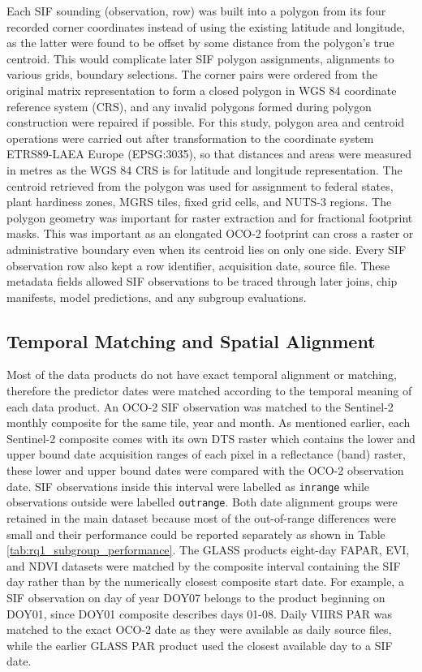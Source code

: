 Each SIF sounding (observation, row) was built into a polygon from its four recorded corner coordinates instead of using the existing latitude and longitude, as the latter were found to be offset by some distance from the polygon's true centroid. This would complicate later SIF polygon assignments, alignments to various grids, boundary selections. The corner pairs were ordered from the original matrix representation to form a closed polygon in WGS 84 coordinate reference system (CRS), and any invalid polygons formed during polygon construction were repaired if possible. For this study, polygon area and centroid operations were carried out after transformation to the coordinate system ETRS89-LAEA Europe (EPSG:3035), so that distances and areas were measured in metres as the WGS 84 CRS is for latitude and longitude representation. The centroid retrieved from the polygon was used for assignment to federal states, plant hardiness zones, MGRS tiles, fixed grid cells, and NUTS-3 regions. The polygon geometry was important for raster extraction and for fractional footprint masks. This was important as  an elongated OCO-2 footprint can cross a raster or administrative boundary even when its centroid lies on only one side. Every SIF observation row also kept a row identifier, acquisition date, source file. These metadata fields allowed SIF observations to be traced through later joins, chip manifests, model predictions, and any subgroup evaluations.

\subsection{Temporal Matching and Spatial Alignment}

Most of the data products do not have exact temporal alignment or matching, therefore the predictor dates were matched according to the temporal meaning of each data product. An OCO-2 SIF observation was matched to the Sentinel-2 monthly composite for the same tile, year and month. As mentioned earlier, each Sentinel-2 composite comes with its own DTS raster which contains the lower and upper bound date acquisition ranges of each pixel in a reflectance (band) raster, these lower and upper bound dates were compared with the OCO-2 observation date. SIF observations inside this interval were labelled as \texttt{inrange} while observations outside were labelled \texttt{outrange}. Both date alignment groups were retained in the main dataset because most of the out-of-range differences were small and their performance could be reported separately as shown in Table \ref{tab:rq1_subgroup_performance}. The GLASS products eight-day FAPAR, EVI, and NDVI datasets were matched by the composite interval containing the SIF day rather than by the numerically closest composite start date. For example, a SIF observation on day of year DOY07 belongs to the product beginning on DOY01, since DOY01 composite  describes days 01-08. Daily VIIRS PAR was matched to the exact OCO-2 date as they were available as daily source files, while the earlier GLASS PAR product used the closest available day to a SIF date.

